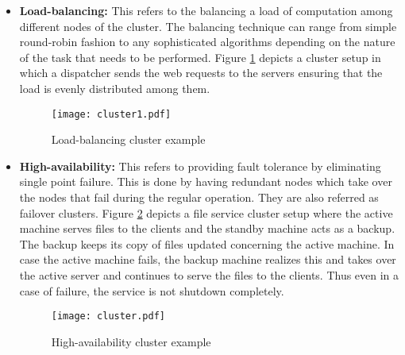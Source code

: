 \begin{itemize}
  \item \textbf{Load-balancing:} This refers to the balancing a load of computation among different nodes of the cluster. The balancing technique can range from simple round-robin fashion to any sophisticated algorithms depending on the nature of the task that needs to be performed. Figure \ref{figures:cluster1} depicts a cluster setup in which a dispatcher sends the web requests to the servers ensuring that the load is evenly distributed among them.
  
    \makeatletter
    \setlength{\intextsep}{25pt}
    \makeatother

    \begin{figure}[h!]
    \centering
    \texttt{[image: cluster1.pdf]}
    \caption{Load-balancing cluster example}\label{figures:cluster1}
    \end{figure}

  \item \textbf{High-availability:} This refers to providing fault tolerance by eliminating single point failure. This is done by having redundant nodes which take over the nodes that fail during the regular operation. They are also referred as failover clusters. Figure \ref{figures:cluster} depicts a file service cluster setup where the active machine serves files to the clients and the standby machine acts as a backup. The backup keeps its copy of files updated concerning the active machine. In case the active machine fails, the backup machine realizes this and takes over the active server and continues to serve the files to the clients. Thus even in a case of failure, the service is not shutdown completely.

    \begin{figure}[h!]
    \centering
    \texttt{[image: cluster.pdf]}
    \caption{High-availability cluster example}\label{figures:cluster}
    \end{figure}

\end{itemize} 

